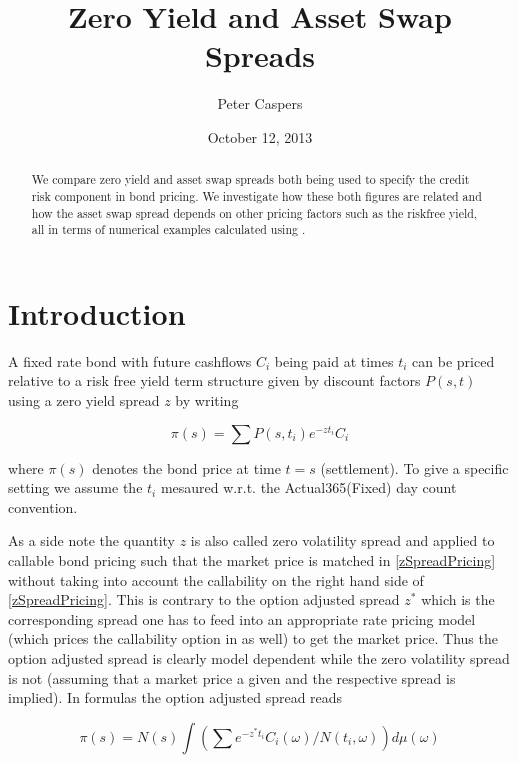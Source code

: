 \documentclass{amsart}
\theoremstyle{plain}
\numberwithin{equation}{section}
\begin{document}


\title{Zero Yield and Asset Swap Spreads}
\author{Peter Caspers}
\date{October 12, 2013}
\maketitle

\begin{abstract}
We compare zero yield and asset swap spreads both being used to specify the credit
risk component in bond pricing. We investigate how these both figures are related
and how the asset swap spread depends on other pricing factors such as the riskfree
yield, all in terms of numerical examples calculated using \cite{ql}.
\end{abstract}

\section{Introduction}

A fixed rate bond with future cashflows $C_i$ being paid at times $t_i$ can be priced relative to a risk free yield term structure given by discount factors $P(s,t)$ using a zero yield spread $z$ by writing

\begin{equation}\label{zSpreadPricing}
\pi(s) = \sum P(s,t_i) e^{-z t_i}  C_i
\end{equation}

where $\pi(s)$ denotes the bond price at time $t=s$ (settlement). To give a specific setting we assume the $t_i$ mesaured w.r.t. the Actual365(Fixed) day count convention.

As a side note the quantity $z$ is also called zero volatility spread and applied to callable bond pricing such that the market price is matched in \ref{zSpreadPricing} without taking into account the callability on the right hand side of \ref{zSpreadPricing}. This is contrary to the option adjusted spread $z^*$ which is the corresponding spread one has to feed into an appropriate rate pricing model (which prices the callability option in as well) to get the market price. Thus the option adjusted spread is clearly model dependent while the zero volatility spread is not (assuming that a market price a given and the respective spread is implied). In formulas the option adjusted spread reads

\begin{equation}
\pi(s) = N(s) \int \left( \sum e^{-z^* t_i} C_i(\omega) / N(t_i, \omega) \right) d\mu(\omega)
\end{equation}
\end{document}
